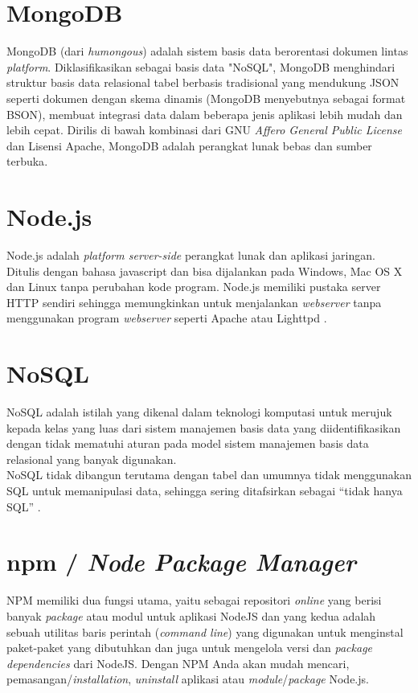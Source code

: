 	
	\section{  MongoDB}
	MongoDB (dari \textit{humongous}) adalah sistem basis data berorentasi dokumen lintas \textit{platform}. Diklasifikasikan sebagai basis data "NoSQL", MongoDB menghindari struktur basis data relasional tabel berbasis tradisional yang mendukung JSON seperti dokumen dengan skema dinamis (MongoDB menyebutnya sebagai format BSON), membuat integrasi data dalam beberapa jenis aplikasi lebih mudah dan lebih cepat. Dirilis di bawah kombinasi dari GNU \textit{Affero General Public License }dan Lisensi Apache, MongoDB adalah perangkat lunak bebas dan sumber terbuka\cite{noauthor_mongodb_2017}.
	    
	\section{Node.js}
	Node.js adalah \textit{platform server-side} perangkat lunak dan aplikasi jaringan. Ditulis dengan bahasa javascript dan bisa dijalankan pada Windows, Mac OS X dan Linux tanpa perubahan kode program. Node.js memiliki pustaka server HTTP sendiri sehingga memungkinkan untuk menjalankan \textit{webserver} tanpa menggunakan program \textit{webserver} seperti Apache atau Lighttpd \cite{noauthor_node.js_2014}.
	    
	\section{NoSQL}
	NoSQL adalah istilah yang dikenal dalam teknologi komputasi untuk merujuk kepada kelas yang luas dari sistem manajemen basis data yang diidentifikasikan dengan tidak mematuhi aturan pada model sistem manajemen basis data relasional yang banyak digunakan.
	\\ \indent
	NoSQL tidak dibangun terutama dengan tabel dan umumnya tidak menggunakan SQL untuk memanipulasi data, sehingga sering ditafsirkan sebagai “tidak hanya SQL” \cite{wikipedia_nosql_nodate}.

	\section{  npm / \textit{Node Package Manager}}
	NPM memiliki dua fungsi utama, yaitu sebagai repositori \textit{online} yang berisi banyak \textit{package} atau modul untuk aplikasi NodeJS dan yang kedua adalah sebuah utilitas baris perintah (\textit{command line}) yang digunakan untuk menginstal paket-paket yang dibutuhkan dan juga untuk mengelola versi dan \textit{package dependencies} dari NodeJS. Dengan NPM Anda akan mudah mencari, pemasangan/\textit{installation}, \textit{uninstall} aplikasi atau \textit{module}/\textit{package }Node.js\cite{azurri_node_2016}.
	

